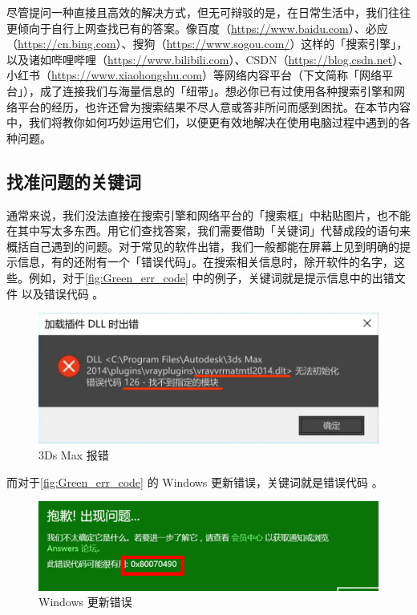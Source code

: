 尽管提问一种直接且高效的解决方式，但无可辩驳的是，在日常生活中，我们往往更倾向于自行上网查找已有的答案。像百度（\url{https://www.baidu.com}）、必应（\url{https://cn.bing.com}）、搜狗（\url{https://www.sogou.com/}）这样的「搜索引擎」，以及诸如哔哩哔哩（\url{https://www.bilibili.com}）、CSDN（\url{https://blog.csdn.net}）、小红书（\url{https://www.xiaohongshu.com}）等网络内容平台（下文简称「网络平台」），成了连接我们与海量信息的「纽带」。想必你已有过使用各种搜索引擎和网络平台的经历，也许还曾为搜索结果不尽人意或答非所问而感到困扰。在本节内容中，我们将教你如何巧妙运用它们，以便更有效地解决在使用电脑过程中遇到的各种问题。

\subsection{找准问题的关键词}

通常来说，我们没法直接在搜索引擎和网络平台的「搜索框」中粘贴图片，也不能在其中写太多东西。用它们查找答案，我们需要借助「关键词」代替成段的语句来概括自己遇到的问题。对于常见的软件出错，我们一般都能在屏幕上见到明确的提示信息，有的还附有一个「错误代码」。在搜索相关信息时，除开软件的名字，这些。例如，对于\autoref{fig:Green_err_code} 中的例子，关键词就是提示信息中的出错文件  以及错误代码 。

\begin{figure}[htb!]
  \centering
  \includegraphics[width=.7\textwidth]{assets/basic/3dsMax_error.png}
  \caption{3Ds Max 报错}
  \label{fig:3dsMax_error}
\end{figure}

而对于\autoref{fig:Green_err_code} 的 Windows 更新错误，关键词就是错误代码 。

\begin{figure}[htb!]
  \centering
  \includegraphics[width=.8\textwidth]{assets/basic/Green_err_code.png}
  \caption{Windows 更新错误}
  \label{fig:Green_err_code}
\end{figure}

